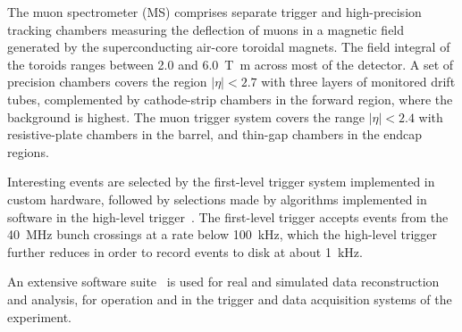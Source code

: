The muon spectrometer (MS) comprises separate trigger and
high-precision tracking chambers measuring the deflection of muons in a magnetic field generated by the superconducting air-core toroidal magnets.
The field integral of the toroids ranges between \num{2.0} and \SI{6.0}{\tesla\metre}
across most of the detector. 
A set of precision chambers covers the region \(|\eta| < 2.7\) with three layers of monitored drift tubes,
complemented by cathode-strip chambers in the forward region, where the background is highest.
The muon trigger system covers the range \(|\eta| < 2.4\) with resistive-plate chambers in the barrel, and thin-gap chambers in the endcap regions.

Interesting events are selected by the first-level trigger system implemented in custom hardware,
followed by selections made by algorithms implemented in software in the high-level trigger~\cite{TRIG-2016-01}. 
The first-level trigger accepts events from the \SI{40}{\MHz} bunch crossings at a rate below \SI{100}{\kHz},
which the high-level trigger further reduces in order to record events to disk at about \SI{1}{\kHz}.

An extensive software suite~\cite{ATL-SOFT-PUB-2021-001} is used for real and simulated data reconstruction
and analysis, for operation and in the trigger and data acquisition systems of the experiment.
